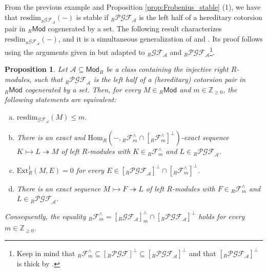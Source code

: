 \documentclass[10pt,reqno]{amsart}
\numberwithin{equation}{section}
\newtheorem{proposition}[definition]{Proposition}
\theoremstyle{remark}
\newcommand{\Ext}{\mathrm{Ext}}
\newcommand{\Hom}{\mathrm{Hom}}
\newcommand{\A}{\mathcal{A}}
\newcommand{\resdim}{\mathrm{resdim}}
\newcommand{\GF}{\mathcal{GF}}
\begin{document}
 
From the previous example and Proposition \ref{prop:Frobenius_stable} (1), we have that $\resdim_{{}_R\mathcal{GF}_{\A}}(-)$ is stable if ${}_R\mathcal{PGF}_{\mathcal{A}}$ is the left half of a hereditary cotorsion pair in ${}_R\mathsf{Mod}$ cogenerated by a set. The following result characterizes $\resdim_{{}_R\mathcal{GF}_{\A}}(-)$, and it is a simultaneous generalization of \cite[Thm. 2.14]{EstradaMarco} and \cite[Thm. 3.4]{Rachid}. Its proof follows using the arguments given in \cite[Thm. 3.4]{Rachid} but adapted to ${}_R\mathcal{GF}_{\A}$ and ${}_R\mathcal{PGF}_{\A}$\footnote{Keep in mind that ${}_R\mathcal{F}^\wedge_m \subseteq [{}_R\mathcal{PGF}]^\perp \subseteq [{}_R\mathcal{PGF}_{\A}]^\perp$ and that $[{}_R\mathcal{PGF}_{\A}]^\perp$ is thick by \cite[Proof of Thm. 3.2]{EstradaMarco}.}. \\


\begin{proposition} \label{General-Gillespie}
Let $\A \subseteq \mathsf{Mod}_R$ be a class containing the injective right $R$-modules, such that ${}_R\mathcal{PGF}_{\mathcal{A}}$ is the left half of a (hereditary) cotorsion pair in ${}_R\mathsf{Mod}$ cogenerated by a set. Then, for every $M \in {}_R\mathsf{Mod}$ and $m \in \mathbb{Z}_{\geq 0}$, the following statements are equivalent:
\begin{enumerate}[(a)]
\item $\resdim _{\GF _{\A}} (M) \leq m$.

\item There is an exact and $\Hom_R(-,{}_R\mathcal{F}^\wedge_m \cap [{}_R\mathcal{F}^\wedge_m]^\perp)$-exact sequence $ K \rightarrowtail L \twoheadrightarrow M $ of left $R$-modules with $K \in {}_R\mathcal{F}^\wedge_m$ and $L \in {}_R\mathcal{PGF}_{\mathcal{A}}$.

\item $\Ext_R^1(M, E) = 0$ for every $E \in [{}_R\mathcal{PGF}_{\mathcal{A}}]^\perp \cap [{}_R\mathcal{F}^\wedge_m]^\perp$. 

\item There is an exact sequence $M \rightarrowtail F \twoheadrightarrow L$ of left $R$-modules with $F \in {}_R\mathcal{F}^\wedge_m$ and $L \in {}_R\mathcal{PGF}_{\mathcal{A}}$.
\end{enumerate}
Consequently, the equality ${}_R\mathcal{F}^\wedge_m = [{}_R\mathcal{GF}_{\A}]^\wedge_m \cap [{}_R\mathcal{PGF}_{\mathcal{A}}]^\perp$ holds for every $m \in \mathbb{Z}_{\geq 0}$. \\
\end{proposition}
\end{document}
